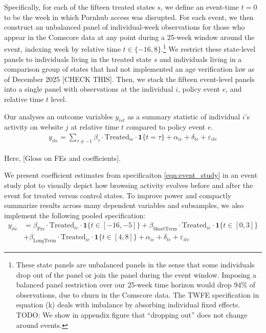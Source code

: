 Specifically, for each of the fifteen treated states $s$, we define an event-time $t=0$ to be the week in which Pornhub access was disrupted. For each event, we then construct an unbalanced panel of individual-week observations for those who appear in the Comscore data at any point during a 25-week window around the event, indexing week by relative time $t \in \{-16, 8\}$.\footnote{These state panels are unbalanced panels in the sense that some individuals drop out of the panel or join the panel during the event window. Imposing a balanced panel restriction over our 25-week time horizon would drop 94\% of observations, due to churn in the Comscore data. The TWFE specification in equation (k) deals with imbalance by absorbing individual fixed effects. TODO: We show in appendix figure that ``dropping out'' does not change around events.} %
We restrict these state-level panels to individuals living in the treated state $s$ and individuals living in a comparison group of states that had not implemented an age verification law as of December 2025 [CHECK THIS]. Then, we stack the fifteen event-level panels into a single panel with observations at the individual $i$, policy event $e$, and relative time $t$ level.

Our analyses an outcome variables $y_{ist}$ as a summary statistic of individual $i$'s activity on website $j$ at relative time $t$ compared to policy event $e$.
\begin{align}
    y_{ite} = \sum_{\tau \neq -1} \beta_{\tau} \cdot \text{Treated}_{ie} \cdot \mathbf{1} \{t = \tau\}+ \alpha_{ie} + \delta_{te} + \varepsilon_{ite} \label{eqn:event_study}
\end{align}

Here, [Gloss on FEs and coefficients]. 

We present coefficient estimates from specificaiton \ref{eqn:event_study} in an event study plot to visually depict how browsing activity evolves before and after the event for treated versus control states. To improve power and compactly summarize results across many dependent variables and subsamples, we also implement the following pooled specification:
\begin{align}
    y_{ite} &= \beta_\text{Pre} \cdot \text{Treated}_{ie} \cdot \mathbf{1}\{t \in [-16, -5]\} + \beta_\text{ShortTerm} \cdot \text{Treated}_{ie} \cdot \mathbf{1}\{t \in [0,3]\} \nonumber \\ 
    &+ \beta_\text{LongTerm} \cdot \text{Treated}_{ie} \cdot \mathbf{1}\{t \in [4, 8]\} + \alpha_{ie} + \delta_{te} + \varepsilon_{ite} \label{eqn:pooled_event_study} 
\end{align}

